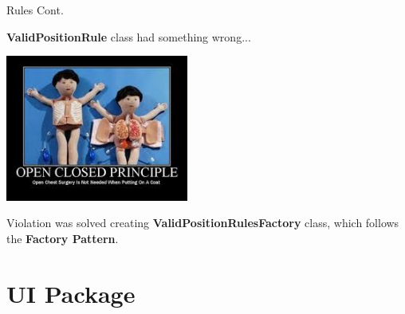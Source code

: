 \documentclass{beamer}
\begin{document}
  \begin{frame} {Rules Cont.}

    \textbf{ValidPositionRule} class had something wrong...

    \vspace{1em}


    \pause
    \hfill
    \includegraphics[width=0.45\textwidth]{img/openclosedprinciple.jpeg}

    \pause

    \vspace{1em}

    Violation was solved creating \textbf{ValidPositionRulesFactory} class, which follows the \textbf{Factory Pattern}.

  \end{frame}



\section{UI Package}

\end{document}
